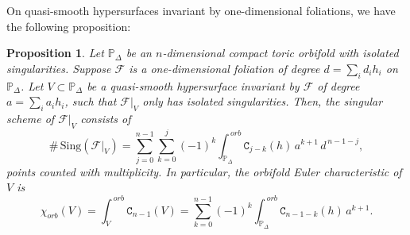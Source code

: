 \documentclass[11pt]{amsart}
\theoremstyle{plain}
\newtheorem{prop}{Proposition}[section]
\theoremstyle{definition}
\begin{document}
On quasi-smooth hypersurfaces invariant by one-dimensional foliations, we have the following proposition:

\begin{prop} \label{pro2} Let $\mathbb{P}_{\Delta}$ be an $n$-dimensional compact toric orbifold with isolated singularities.
Suppose $\mathcal{F}$ is a one-dimensional foliation of degree $d=\sum_{i}d_{i} h_i$
on $\mathbb{P}_{\Delta}$. Let $V \subset \mathbb{P}_{\Delta}$ be a quasi-smooth hypersurface invariant by $\mathcal{F}$ 
of degree $a=\sum_{i}a_{i} h_i$, such that $\mathcal{F}|_V$ only has isolated singularities. 
Then, the singular scheme of $\mathcal{F}|_V$ consists of
$$\#\,\mathrm{Sing}(\mathcal{F}|_V)
=\sum_{j=0}^{n-1} \sum_{k=0}^{j}(-1)^{k}\int_{\mathbb{P}_{\Delta}}^{\,orb}\texttt{C}_{j-k}(h)\,a^{k+1}\,d^{\,n-1-j},$$
points counted with multiplicity. In particular, the orbifold Euler characteristic of $V$ is 
$$\chi_{orb}(V)=\int_V^{\,orb} \texttt{C}_{n-1}(V)
=\sum_{k=0}^{n-1}(-1)^{k}\int_{\mathbb{P}_{\Delta}}^{\,orb}\texttt{C}_{n-1-k}(h)\,a^{k+1}.$$
\end{prop}
\end{document}
